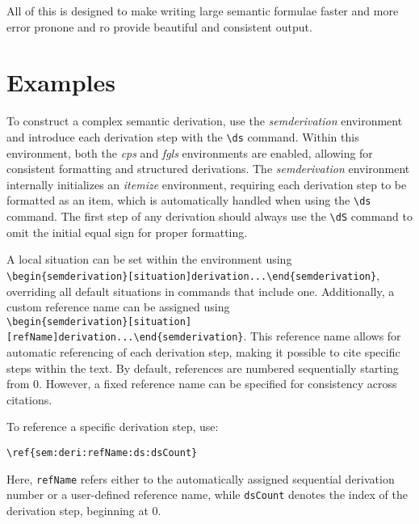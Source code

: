 \documentclass[10pt, a4paper]{article}
\begin{document}
	All of this is designed to make writing large semantic formulae faster and more error pronone and ro provide beautiful and consistent output.
	
	\section{Examples}
	To construct a complex semantic derivation, use the \textit{semderivation} environment and introduce each derivation step with the \verb=\ds= command. Within this environment, both the \textit{cps} and \textit{fgls} environments are enabled, allowing for consistent formatting and structured derivations. The \textit{semderivation} environment internally initializes an \textit{itemize} environment, requiring each derivation step to be formatted as an item, which is automatically handled when using the \verb=\ds= command. The first step of any derivation should always use the \verb=\dS= command to omit the initial equal sign for proper formatting.
	
	A local situation can be set within the environment using \\\verb=\begin{semderivation}[situation]derivation...\end{semderivation}=, overriding all default situations in commands that include one. Additionally, a custom reference name can be assigned using \\\verb=\begin{semderivation}[situation][refName]derivation...\end{semderivation}=. This reference name allows for automatic referencing of each derivation step, making it possible to cite specific steps within the text. By default, references are numbered sequentially starting from 0. However, a fixed reference name can be specified for consistency across citations.
	
	To reference a specific derivation step, use:
	
	\verb=\ref{sem:deri:refName:ds:dsCount}=
	
	Here, \texttt{refName} refers either to the automatically assigned sequential derivation number or a user-defined reference name, while \texttt{dsCount} denotes the index of the derivation step, beginning at 0.
	
\end{document}
